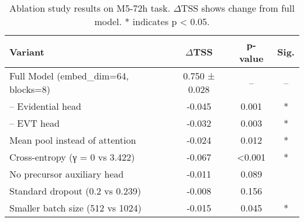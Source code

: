 
\begin{table}[ht]\centering
\caption{Ablation study results on M5-72h task. $\Delta$TSS shows change from full model. * indicates p < 0.05.}
\label{tab:ablation}
\begin{tabular}{lccc}
\toprule
\textbf{Variant} & \textbf{$\Delta$TSS} & \textbf{p-value} & \textbf{Sig.} \\
\midrule
Full Model (embed_dim=64, blocks=8) & 0.750 ± 0.028 & -- & -- \\
– Evidential head & -0.045 & 0.001 & * \\
– EVT head & -0.032 & 0.003 & * \\
Mean pool instead of attention & -0.024 & 0.012 & * \\
Cross-entropy (γ = 0 vs 3.422) & -0.067 & <0.001 & * \\
No precursor auxiliary head & -0.011 & 0.089 &  \\
Standard dropout (0.2 vs 0.239) & -0.008 & 0.156 &  \\
Smaller batch size (512 vs 1024) & -0.015 & 0.045 & * \\

\bottomrule
\end{tabular}
\end{table}
